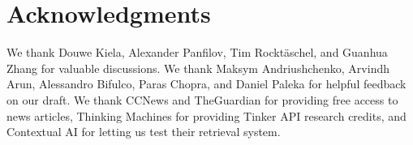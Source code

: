 \section*{Acknowledgments}
\label{sec:acknowledgments}

 We thank Douwe Kiela, Alexander Panfilov, Tim Rockt{\"a}schel, and Guanhua Zhang for valuable discussions. We thank Maksym Andriushchenko, Arvindh Arun, Alessandro Bifulco, Paras Chopra, and Daniel Paleka for helpful feedback on our draft. We thank CCNews and TheGuardian for providing free access to news articles, Thinking Machines for providing Tinker API research credits, and Contextual AI for letting us test their retrieval system.